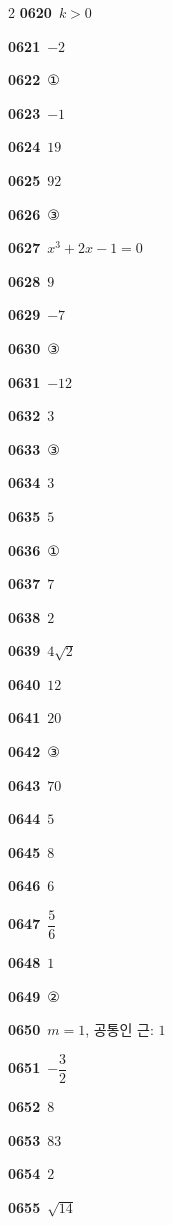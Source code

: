 \documentclass[10pt,a4paper]{article}
\begin{document}
\begin{multicols}{2}
\noindent\textbf{0620}\ $k>0$\par
\noindent\textbf{0621}\ $-2$\par
\noindent\textbf{0622}\ ①\par
\noindent\textbf{0623}\ $-1$\par
\noindent\textbf{0624}\ $19$\par
\noindent\textbf{0625}\ $92$\par
\noindent\textbf{0626}\ ③\par
\noindent\textbf{0627}\ $x^3+2x-1=0$\par
\noindent\textbf{0628}\ $9$\par
\noindent\textbf{0629}\ $-7$\par
\noindent\textbf{0630}\ ③\par
\noindent\textbf{0631}\ $-12$\par
\noindent\textbf{0632}\ $3$\par
\noindent\textbf{0633}\ ③\par
\noindent\textbf{0634}\ $3$\par
\noindent\textbf{0635}\ $5$\par
\noindent\textbf{0636}\ ①\par
\noindent\textbf{0637}\ $7$\par
\noindent\textbf{0638}\ $2$\par
\noindent\textbf{0639}\ $4\sqrt{2}$\par
\noindent\textbf{0640}\ $12$\par
\noindent\textbf{0641}\ $20$\par
\noindent\textbf{0642}\ ③\par
\noindent\textbf{0643}\ $70$\par
\noindent\textbf{0644}\ $5$\par
\noindent\textbf{0645}\ $8$\par
\noindent\textbf{0646}\ $6$\par
\noindent\textbf{0647}\ $\dfrac{5}{6}$\par
\noindent\textbf{0648}\ $1$\par
\noindent\textbf{0649}\ ②\par
\noindent\textbf{0650}\ $m=1$, 공통인 근: $1$\par
\noindent\textbf{0651}\ $-\dfrac{3}{2}$\par
\noindent\textbf{0652}\ $8$\par
\noindent\textbf{0653}\ $83$\par
\noindent\textbf{0654}\ $2$\par
\noindent\textbf{0655}\ $\sqrt{14}$\par

\end{multicols}
\end{document}
